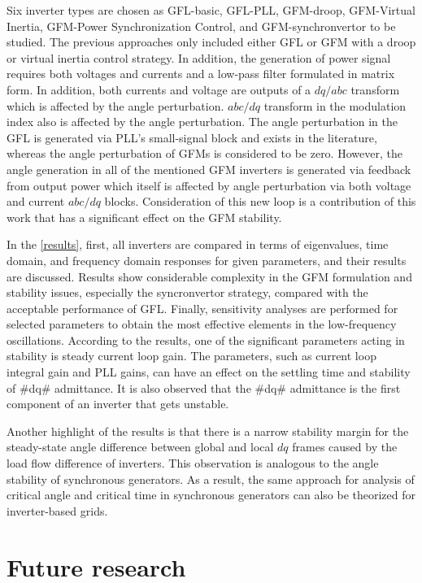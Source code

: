 Six inverter types are chosen as  \gls{GFL}-basic, \gls{GFL}-\gls{PLL}, \gls{GFM}-droop, \gls{GFM}-Virtual Inertia, \gls{GFM}-Power Synchronization Control, and \gls{GFM}-synchronvertor to be studied. The previous approaches only included either GFL or GFM with a droop or virtual inertia control strategy. In addition, the generation of power signal requires both voltages and currents and a low-pass filter formulated in matrix form. In addition, both currents and voltage are outputs of a $dq/abc$ transform which is affected by the angle perturbation. $abc/dq$ transform in the modulation index also is affected by the angle perturbation. The angle perturbation in the GFL is generated via PLL's small-signal block and exists in the literature, whereas the angle perturbation of GFMs is considered to be zero. However, the angle generation in all of the mentioned GFM inverters is generated via feedback from output power which itself is affected by angle perturbation via both voltage and current $abc/dq$ blocks. Consideration of this new loop is a contribution of this work that has a significant effect on the GFM stability.

In the \ref{results}, first, all inverters are compared in terms of eigenvalues, time domain, and frequency domain responses for given parameters, and their results are discussed. Results show considerable complexity in the GFM formulation and stability issues, especially the syncronvertor strategy, compared with the acceptable performance of GFL. Finally, sensitivity analyses are performed for selected parameters to obtain the most effective elements in the low-frequency oscillations. According to the results, one of the significant parameters acting in stability is steady current loop gain. The parameters, such as current loop integral gain and PLL gains, can have an effect on the settling time and stability of #dq# admittance. It is also observed that the #dq# admittance is the first component of an inverter that gets unstable. 

Another highlight of the results is that there is a narrow stability margin for the steady-state angle difference between global and local $dq$ frames caused by the load flow difference of inverters. This observation is analogous to the angle stability of synchronous generators. As a result, the same approach for analysis of critical angle and critical time in synchronous generators can also be theorized for inverter-based grids.




\section{Future research}

